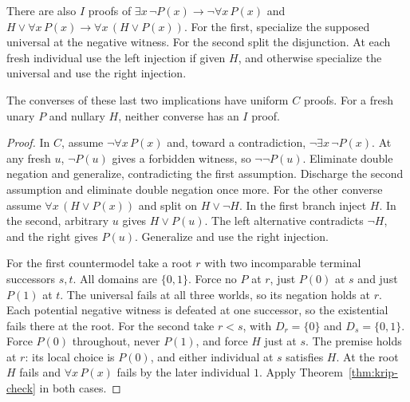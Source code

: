There are also $I$ proofs of
$\exists x\,\neg P(x)\to\neg\forall x\,P(x)$ and
$H\vee\forall x\,P(x)\to\forall x\,(H\vee P(x))$.
For the first, specialize the supposed universal at the negative
witness. For the second split the disjunction. At each fresh individual
use the left injection if given $H$, and otherwise specialize the
universal and use the right injection.

\begin{proposition}\label{prop:quant-krip}
The converses of these last two implications have uniform $C$ proofs.
For a fresh unary $P$ and nullary $H$, neither converse has an $I$ proof.
\end{proposition}
\begin{proof}
In $C$, assume $\neg\forall x\,P(x)$ and, toward a contradiction,
$\neg\exists x\,\neg P(x)$. At any fresh $u$, $\neg P(u)$ gives a
forbidden witness, so $\neg\neg P(u)$. Eliminate double negation and
generalize, contradicting the first assumption. Discharge the second
assumption and eliminate double negation once more. For the other
converse assume $\forall x\,(H\vee P(x))$ and split on $H\vee\neg H$.
In the first branch inject $H$. In the second, arbitrary $u$ gives
$H\vee P(u)$. The left alternative contradicts $\neg H$, and the right
gives $P(u)$. Generalize and use the right injection.

For the first countermodel take a root $r$ with two incomparable
terminal successors $s,t$. All domains are $\{0,1\}$. Force no
$P$ at $r$, just $P(0)$ at $s$ and just $P(1)$ at $t$. The universal
fails at all three worlds, so its negation holds at $r$. Each potential
negative witness is defeated at one successor, so the existential
fails there at the root. For the second take $r<s$, with
$D_r=\{0\}$ and $D_s=\{0,1\}$. Force $P(0)$ throughout, never
$P(1)$, and force $H$ just at $s$. The premise holds at $r$: its
local choice is $P(0)$, and either individual at $s$ satisfies $H$.
At the root $H$ fails and $\forall x\,P(x)$ fails by the later
individual $1$. Apply Theorem~\ref{thm:krip-check} in both cases.
\end{proof}

